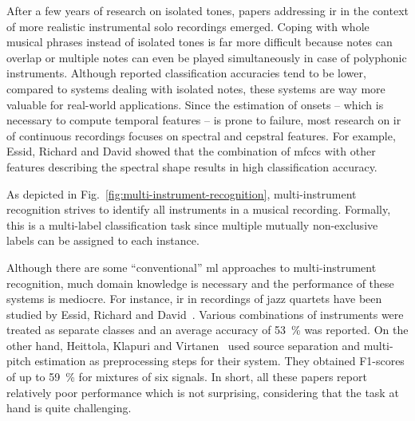After a few years of research on isolated tones, papers addressing \gls{ir} in the context of more realistic instrumental solo recordings emerged. Coping with whole musical phrases instead of isolated tones is far more difficult because notes can overlap or multiple notes can even be played simultaneously in case of polyphonic instruments. Although reported classification accuracies tend to be lower, compared to systems dealing with isolated notes, these systems are way more valuable for real-world applications. Since the estimation of onsets -- which is necessary to compute temporal features -- is prone to failure, most research on \gls{ir} of continuous recordings focuses on spectral and cepstral features. For example, Essid, Richard and David \cite{david2004efficient} showed that the combination of \glspl{mfcc} with other features describing the spectral shape results in high classification accuracy.

As depicted in Fig.~\ref{fig:multi-instrument-recognition}, multi-instrument recognition strives to identify all instruments in a musical recording. Formally, this is a multi-label classification task since multiple mutually non-exclusive labels can be assigned to each instance.\\

Although there are some \enquote{conventional} \gls{ml} approaches to multi-instrument recognition, much domain knowledge is necessary and the performance of these systems is mediocre. For instance, \gls{ir} in recordings of jazz quartets have been studied by Essid, Richard and David~\cite{essid2005instrument}. Various combinations of instruments were treated as separate classes and an average accuracy of \SI{53}{\percent} was reported. On the other hand, Heittola, Klapuri and Virtanen~\cite{heittola2009musical} used source separation and multi-pitch estimation as preprocessing steps for their system. They obtained F1-scores of up to \SI{59}{\percent} for mixtures of six signals. In short, all these papers report relatively poor performance which is not surprising, considering that the task at hand is quite challenging.\\

